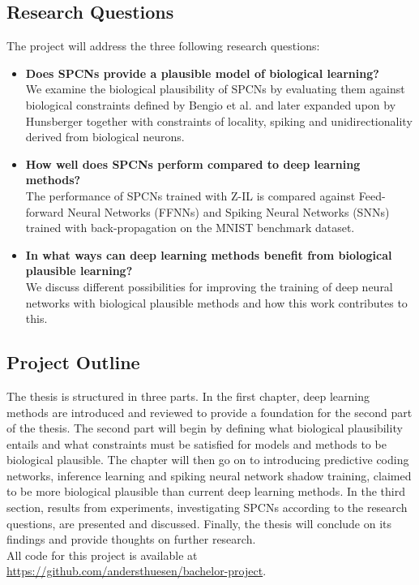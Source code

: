 \documentclass[a4paper,11pt]{article}
\begin{document}
\subsection{Research Questions}
The project will address the three following research questions:
\begin{itemize}
  \item \textbf{Does SPCNs provide a plausible model of biological learning?} \vspace{5pt} \\ 
  We examine the biological plausibility of SPCNs by evaluating them against biological constraints defined by Bengio et al. \cite{BengioLBL15} and later expanded upon by Hunsberger \cite{Eric2018} together with constraints of locality, spiking and unidirectionality derived from biological neurons. 

  \item \textbf{How well does SPCNs perform compared to deep learning methods?} \vspace{5pt} \\
  The performance of SPCNs trained with Z-IL is compared against Feed-forward Neural Networks (FFNNs) and Spiking Neural Networks (SNNs) trained with back-propagation on the MNIST benchmark dataset.

  \item \textbf{In what ways can deep learning methods benefit from biological plausible learning?} \vspace{5pt} \\
  We discuss different possibilities for improving the training of deep neural networks with biological plausible methods and how this work contributes to this. 
\end{itemize}
\subsection{Project Outline}
The thesis is structured in three parts. In the first chapter, deep learning methods are introduced and reviewed to provide a foundation for the second part of the thesis. The second part will begin by defining what biological plausibility entails and what constraints must be satisfied for models and methods to be biological plausible. The chapter will then go on to introducing predictive coding networks, inference learning and spiking neural network shadow training, claimed to be more biological plausible than current deep learning methods. In the third section, results from experiments, investigating SPCNs according to the research questions, are presented and discussed. Finally, the thesis will conclude on its findings and provide thoughts on further research. \\
All code for this project is available at \href{https://github.com/andersthuesen/bachelor-project}{https://github.com/andersthuesen/bachelor-project}.
\end{document}
